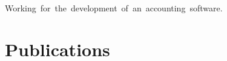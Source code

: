 \documentclass[%
               doublesided,
               paper=a4,
               fontsize=11pt
              ]{my-resume}
\begin{document}
{    
    \hbox{\small Working for the development of an accounting software.}
    \divider
    
    


    
    \section{Publications}
    \nocite{*}
    \printbibliography[heading=none]
    
    
}
\makebody
\clearpage
\end{document}
